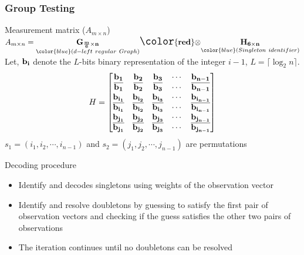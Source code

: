 	  \begin{frame}\frametitle{Group Testing}
\vspace*{-0.1in}
  \begin{block}{Measurement matrix ($A_{m\times n}$)}
  {\centering
  $A_{m \times n}  = \underset{\color{blue} (d-left \ regular \ Graph)}{\bf G_{\frac{m}{6} \times n}} {\Large \bf \color{red} \otimes} \underset{\color{blue} (Singleton \ identifier)}{\bf H_{6 \times n}}$ \\
  \vspace{6pt}
  Let, $\bf{b_i}$ denote the {\color{blue}$L$-bits binary representation of the integer $i-1$}, $L=\lceil \log_2{n} \rceil$.
   {\small \[ H = \begin{bmatrix}
					\bf{b_1} & \bf{b_2} & \bf{b_3} & \cdots & \bf{b_{n-1}}\\
				   	\bf{\overline{b_1}} & \bf{\overline{b_2}} & \bf{\overline{b_3}} & \cdots & \bf{\overline{b_{n-1}}}\\
					\bf{b_{i_1}} & \bf{b_{i_2}} & \bf{b_{i_3}} & \cdots & \bf{b_{i_{n-1}}}\\
				   	\bf{\overline{b_{i_1}}} & \bf{\overline{b_{i_2}}} & \bf{\overline{b_{i_3}}} & \cdots & \bf{\overline{b_{i_{n-1}}}}\\
				   	
					\bf{b_{j_1}} & \bf{b_{j_2}} & \bf{b_{j_3}} & \cdots & \bf{b_{j_{n-1}}}\\
				   	\bf{\overline{b_{j_1}}} & \bf{\overline{b_{j_2}}} & \bf{\overline{b_{j_3}}} & \cdots & \bf{\overline{b_{j_{n-1}}}} \end{bmatrix} \]
$s_1=(i_1, i_2, \cdots, i_{n-1})$ and $s_2=(j_1, j_2, \cdots, j_{n-1})$ are permutations }}
 \end{block}

\begin{block}{Decoding procedure}
\begin{itemize}
\item  Identify and decodes singletons using weights of the observation vector
\item Identify and resolve doubletons by guessing to satisfy the first pair of observation vectors and checking if the guess satisfies the other two pairs of observations
\item The iteration continues until no doubletons can be resolved
\end{itemize}

\end{block}

     \end{frame}




